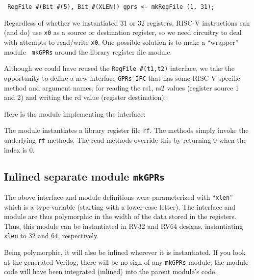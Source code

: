 \begin{tabbing}\footnotesize\tt
\hmm RegFile \#(Bit \#(5), Bit \#(XLEN)) gprs <- mkRegFile (1, 31);
\end{tabbing}

Regardless of whether we instantiated 31 or 32 registers, RISC-V
instructions can (and do) use {\tt x0} as a source or destination
register, so we need circuitry to deal with attempts to read/write
{\tt x0}.  One possible solution is to make a ``wrapper'' module {\tt
mkGPRs} around the library register file module.

Although we could have reused the {\tt RegFile \#(t1,t2)} interface,
we take the opportunity to define a new interface {\tt GPRs\_IFC} that
has some RISC-V specific method and argument names, for reading the
rs1, rs2 values (register source 1 and 2) and writing the rd value
(register destination):




Here is the module implementing the interface:


The module instantiates a library register file {\tt rf}.  The methods
simply invoke the underlying {\tt rf} methods.  The read-methods
override this by returning 0 when the index is 0.





\subsection{Inlined {\vs} separate module {\tt mkGPRs}}

The above interface and module definitions were parameterized with
``\verb|xlen|'' which is a type-variable (starting with a lower-case
letter).  The interface and module are thus polymorphic in the width
of the data stored in the registers.  Thus, this module can be
instantiated in RV32 and RV64 designs, instantiating \verb|xlen| to 32
and 64, respectively.

Being polymorphic, it will also be inlined wherever it is
instantiated.  If you look at the generated Verilog, there will be no
sign of any \verb|mkGPRs| module; the module code will have been
integrated (inlined) into the parent module's code.

